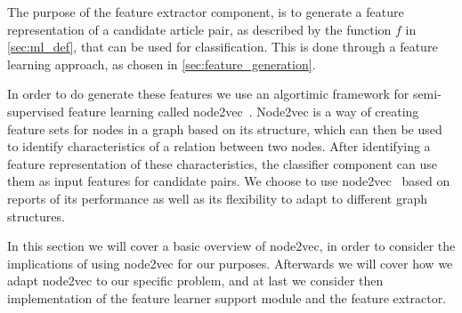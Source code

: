 The purpose of the feature extractor component, is to generate a feature representation of a candidate article pair, as described by the function $f$ in \cref{sec:ml_def}, that can be used for classification. This is done through a feature learning approach, as chosen in \cref{sec:feature_generation}.




In order to do generate these features we use an algortimic framework for semi-supervised feature learning called node2vec~\cite{node2vec}. Node2vec is a way of creating feature sets  for nodes in a graph based on its structure, which can then be used to identify characteristics of a relation between two nodes. After identifying a feature representation of these characteristics, the classifier component can use them as input features for candidate pairs. We choose to use node2vec~\cite{node2vec} based on reports of its performance as well as its flexibility to adapt to different graph structures.

In this section we will cover a basic overview of node2vec, in order to consider the implications of using node2vec for our purposes. Afterwards we will cover how we adapt node2vec to our specific problem, and at last we consider then implementation of the feature learner support module and the feature extractor.


